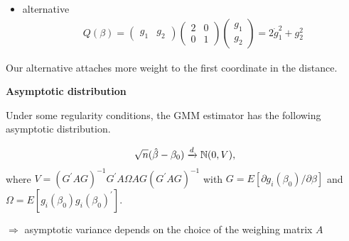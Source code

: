 \begin{frame}

\begin{itemize}
\item alternative
\begin{align*}Q(\beta) =
\left(\begin{matrix}
g_1 & g_2
\end{matrix}\right)
\left(\begin{matrix}
2 & 0 \\
0 & 1
\end{matrix}\right)
\left(\begin{matrix}
g_1 \\
g_2
\end{matrix}\right) = 2 \dot g_1^2 + g_2^2
\end{align*}
\end{itemize}

Our alternative attaches more weight to the first coordinate in the distance.

\end{frame}
\begin{frame}\textbf{Asymptotic distribution}\vspace{0.3cm}

Under some regularity conditions, the GMM estimator has the following asymptotic distribution.

\begin{align*}
\sqrt{n}(\hat{\beta} - \beta_0) \xrightarrow{d} \mathbb{N} (0, V),
\end{align*}
where $V = (G^\prime A G)^{-1} G^\prime A \Omega A G (G^\prime A G)^{-1}$ with $G = E[\partial g_i(\beta_0) / \partial \beta]$ and $\Omega = E[g_i(\beta_0)g_i(\beta_0)^\prime]$.\\\vspace{0.3cm}

$\Rightarrow$ asymptotic variance depends on the choice of the weighing matrix $A$

\end{frame}
